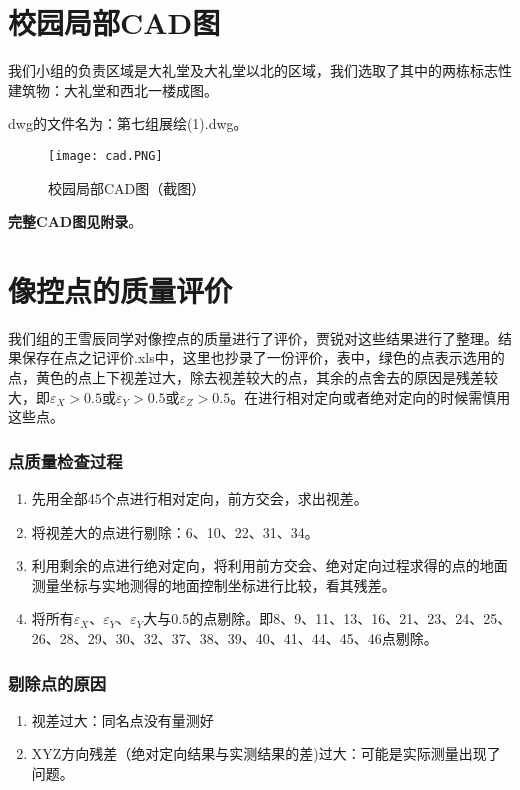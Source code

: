 \section{校园局部CAD图}

我们小组的负责区域是大礼堂及大礼堂以北的区域，我们选取了其中的两栋标志性建筑物：大礼堂和西北一楼成图。

dwg的文件名为：第七组展绘(1).dwg。
\begin{figure}[htbp]
\centering
\caption{校园局部CAD图（截图）}
\texttt{[image: cad.PNG]}
\end{figure}

\textbf{完整CAD图见附录}。

\section{像控点的质量评价}

我们组的王雪辰同学对像控点的质量进行了评价，贾锐对这些结果进行了整理。结果保存在点之记评价.xls中，这里也抄录了一份评价，表中，绿色的点表示选用的点，黄色的点上下视差过大，除去视差较大的点，其余的点舍去的原因是残差较大，即$\varepsilon_X>0.5$或$\varepsilon_Y>0.5$或$\varepsilon_Z>0.5$。在进行相对定向或者绝对定向的时候需慎用这些点。



\subsubsection{点质量检查过程}
\begin{enumerate}
  \item 先用全部45个点进行相对定向，前方交会，求出视差。
  \item 将视差大的点进行剔除：6、10、22、31、34。
  \item 利用剩余的点进行绝对定向，将利用前方交会、绝对定向过程求得的点的地面测量坐标与实地测得的地面控制坐标进行比较，看其残差。
  \item 将所有$\varepsilon_X$、$\varepsilon_Y$、$\varepsilon_Y$大与0.5的点剔除。即8、9、11、13、16、21、23、24、25、26、28、29、30、32、37、38、39、40、41、44、45、46点剔除。
\end{enumerate}

\subsubsection{剔除点的原因}
\begin{enumerate}
  \item 视差过大：同名点没有量测好
  \item XYZ方向残差（绝对定向结果与实测结果的差)过大：可能是实际测量出现了问题。
\end{enumerate}
